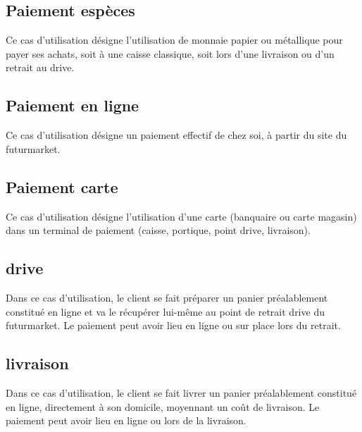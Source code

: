 \subsection{Paiement espèces}
Ce cas d'utilisation désigne l'utilisation de monnaie papier ou métallique pour payer ses achats, soit à une caisse classique, soit lors d'une livraison ou d'un retrait au drive.

\subsection{Paiement en ligne}
Ce cas d'utilisation désigne un paiement effectif de chez soi, à partir du site du futurmarket.

\subsection{Paiement carte}
Ce cas d'utilisation désigne l'utilisation d'une carte (banquaire ou carte magasin) dans un terminal de paiement (caisse, portique, point drive, livraison).

\subsection{drive}
Dans ce cas d'utilisation, le client se fait préparer un panier préalablement constitué en ligne et va le récupérer lui-même au point de retrait drive du futurmarket.
Le paiement peut avoir lieu en ligne ou sur place lors du retrait.

\subsection{livraison}
Dans ce cas d'utilisation, le client se fait livrer un panier préalablement constitué en ligne, directement à son domicile, moyennant un coût de livraison.
Le paiement peut avoir lieu en ligne ou lors de la livraison.
